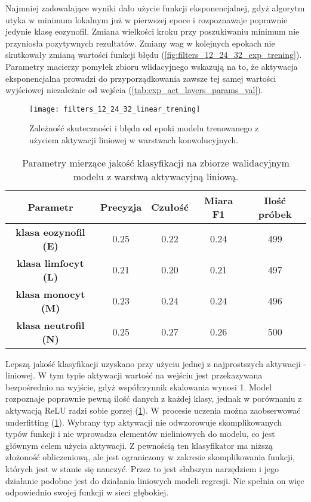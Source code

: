 {\parindent0pt
Najmniej zadowalające wyniki dało użycie funkcji eksponencjalnej, gdyż algorytm utyka w minimum lokalnym już w pierwszej epoce i rozpoznawaje poprawnie jedynie klasę eozynofil. Zmiana wielkości kroku przy poszukiwaniu minimum nie przyniosła pozytywnych rezultatów. Zmiany wag w kolejnych epokach nie skutkowały zmianą wartości funkcji błędu (\ref{fig:filters_12_24_32_exp_trening}). Parametry macierzy pomyłek zbioru wlidacyjnego wskazują na to, że aktywacja eksponencjalna prowadzi do przyporządkowania zawsze tej samej wartości wyjściowej niezależnie od wejścia (\ref{tab:exp_act_layers_params_val}).

\begin{figure}[h!]
	\centering
	\centering
		\texttt{[image: filters\_12\_24\_32\_linear\_trening]}	
	\caption{Zależność skuteczności i błędu od epoki modelu trenowanego z użyciem aktywacji liniowej w warstwach konwolucyjnych.}\label{fig:filters_12_24_32_linear_trening}
\end{figure}

\begin{table}[h!]
\centering
\caption[Short Heading]{Parametry mierzące jakość klasyfikacji na zbiorze walidacyjnym modelu z warstwą aktywacyjną liniową.}
\label{tab:lin_act_layers_params_val}
\begin{tabular}{|c|c|c|c|c|}
\hline
\textbf{Parametr}                               & \textbf{Precyzja} & \textbf{Czułość} & \textbf{Miara F1} & \textbf{Ilość próbek} \\ \hline
\textbf{klasa eozynofil (E)} & 0.25   & 0.22   & 0.24 & 499  \\ \hline
\textbf{klasa limfocyt (L)}& 0.21   & 0.20   & 0.21 & 497  \\ \hline
\textbf{klasa monocyt (M)} & 0.23   & 0.24   & 0.24 & 496  \\ \hline
\textbf{klasa neutrofil (N)} & 0.25   & 0.27    & 0.26 & 500  \\ \hline
\end{tabular}
\end{table}

Lepszą jakość klasyfikacji uzyskano przy użyciu jednej z najprostszych aktywacji - liniowej. W tym typie aktywacji wartość na wejściu jest przekazywana bezpośrednio na wyjście, gdyż współczynnik skalowania wynosi 1. Model rozpoznaje poprawnie pewną ilość danych z każdej klasy, jednak w porównaniu z aktywacją ReLU radzi sobie gorzej (\ref{tab:lin_act_layers_params_val}). W procesie uczenia można zaobserwować underfitting (\ref{fig:filters_12_24_32_linear_trening}). Wybrany typ aktywacji nie odwzorowuje skomplikowanych typów funkcji i nie wprowadza elementów nieliniowych do modelu, co jest głównym celem użycia aktywacji. Z pewnością ten klasyfikator ma niższą złożoność obliczeniową, ale jest ograniczony w zakresie skomplikowania funkcji, których jest w stanie się nauczyć. Przez to jest słabszym narzędziem i jego działanie podobne jest do działania liniowych modeli regresji. Nie spełnia on więc odpowiednio swojej funkcji w sieci głębokiej.

}
